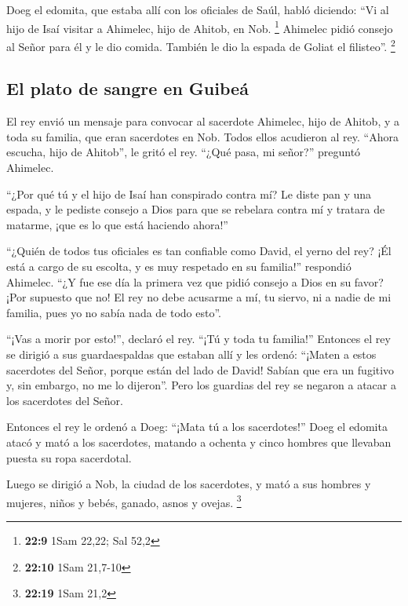  Doeg el edomita, que estaba allí con los oficiales de
Saúl, habló diciendo: ``Vi al hijo de Isaí visitar a Ahimelec, hijo de
Ahitob, en Nob. \footnote{\textbf{22:9} 1Sam 22,22; Sal 52,2}
 Ahimelec pidió consejo al Señor para él y le dio comida.
También le dio la espada de Goliat el filisteo''. \footnote{\textbf{22:10}
  1Sam 21,7-10}

\hypertarget{el-plato-de-sangre-en-guibeuxe1}{%
\subsection{El plato de sangre en
Guibeá}\label{el-plato-de-sangre-en-guibeuxe1}}

 El rey envió un mensaje para convocar al sacerdote
Ahimelec, hijo de Ahitob, y a toda su familia, que eran sacerdotes en
Nob. Todos ellos acudieron al rey.  ``Ahora escucha, hijo
de Ahitob'', le gritó el rey. ``¿Qué pasa, mi señor?'' preguntó
Ahimelec.

 ``¿Por qué tú y el hijo de Isaí han conspirado contra
mí? Le diste pan y una espada, y le pediste consejo a Dios para que se
rebelara contra mí y tratara de matarme, ¡que es lo que está haciendo
ahora!''

 ``¿Quién de todos tus oficiales es tan confiable como
David, el yerno del rey? ¡Él está a cargo de su escolta, y es muy
respetado en su familia!'' respondió Ahimelec.  ``¿Y fue
ese día la primera vez que pidió consejo a Dios en su favor? ¡Por
supuesto que no! El rey no debe acusarme a mí, tu siervo, ni a nadie de
mi familia, pues yo no sabía nada de todo esto''.

 ``¡Vas a morir por esto!'', declaró el rey. ``¡Tú y toda
tu familia!''  Entonces el rey se dirigió a sus
guardaespaldas que estaban allí y les ordenó: ``¡Maten a estos
sacerdotes del Señor, porque están del lado de David! Sabían que era un
fugitivo y, sin embargo, no me lo dijeron''. Pero los guardias del rey
se negaron a atacar a los sacerdotes del Señor.

 Entonces el rey le ordenó a Doeg: ``¡Mata tú a los
sacerdotes!'' Doeg el edomita atacó y mató a los sacerdotes, matando a
ochenta y cinco hombres que llevaban puesta su ropa sacerdotal.

 Luego se dirigió a Nob, la ciudad de los sacerdotes, y
mató a sus hombres y mujeres, niños y bebés, ganado, asnos y ovejas.
\footnote{\textbf{22:19} 1Sam 21,2}

